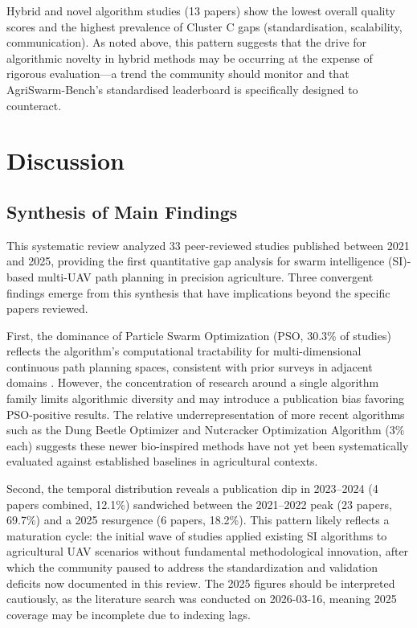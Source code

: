 \documentclass[review,3p,times]{elsarticle}
\begin{document}
Hybrid and novel algorithm studies (13 papers) show the lowest overall quality scores and the highest prevalence of Cluster C gaps (standardisation, scalability, communication). As noted above, this pattern suggests that the drive for algorithmic novelty in hybrid methods may be occurring at the expense of rigorous evaluation---a trend the community should monitor and that AgriSwarm-Bench's standardised leaderboard is specifically designed to counteract.


\section{Discussion}

\subsection{Synthesis of Main Findings}

This systematic review analyzed 33 peer-reviewed studies published between 2021 and 2025, providing the first quantitative gap analysis for swarm intelligence (SI)-based multi-UAV path planning in precision agriculture. Three convergent findings emerge from this synthesis that have implications beyond the specific papers reviewed.

First, the dominance of Particle Swarm Optimization (PSO, 30.3\% of studies) reflects the algorithm's computational tractability for multi-dimensional continuous path planning spaces, consistent with prior surveys in adjacent domains \cite{puente2022,sharma2022}. However, the concentration of research around a single algorithm family limits algorithmic diversity and may introduce a publication bias favoring PSO-positive results. The relative underrepresentation of more recent algorithms such as the Dung Beetle Optimizer \cite{li2023} and Nutcracker Optimization Algorithm \cite{xiao2025} (3\% each) suggests these newer bio-inspired methods have not yet been systematically evaluated against established baselines in agricultural contexts.

Second, the temporal distribution reveals a publication dip in 2023--2024 (4 papers combined, 12.1\%) sandwiched between the 2021--2022 peak (23 papers, 69.7\%) and a 2025 resurgence (6 papers, 18.2\%). This pattern likely reflects a maturation cycle: the initial wave of studies applied existing SI algorithms to agricultural UAV scenarios without fundamental methodological innovation, after which the community paused to address the standardization and validation deficits now documented in this review. The 2025 figures should be interpreted cautiously, as the literature search was conducted on 2026-03-16, meaning 2025 coverage may be incomplete due to indexing lags.
\end{document}
